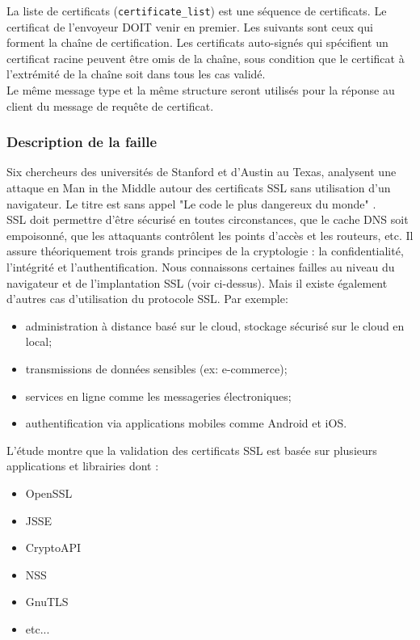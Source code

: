 La liste de certificats (\texttt{certificate\_list}) est une séquence de certificats. Le certificat de l'envoyeur DOIT venir en premier. Les suivants sont ceux qui forment la chaîne de certification. Les certificats auto-signés qui spécifient un certificat racine peuvent être omis de la chaîne, sous condition que le certificat à l'extrémité de la chaîne soit dans tous les cas validé.\\

Le même message type et la même structure seront utilisés pour la réponse au client du message de requête de certificat.


\subsubsection{Description de la faille}

Six chercheurs des universités de Stanford et d'Austin au Texas, analysent une attaque en Man in the Middle autour des certificats SSL sans utilisation d'un navigateur. Le titre est sans appel "Le code le plus dangereux du monde" \cite{validate2012martin}.\\


SSL doit permettre d'être sécurisé en toutes circonstances, que le cache DNS soit empoisonné, que les attaquants contrôlent les points d'accès et les routeurs, etc. Il assure théoriquement trois grands principes de la cryptologie : la confidentialité, l'intégrité et l'authentification. Nous connaissons certaines failles au niveau du navigateur et de l'implantation SSL (voir ci-dessus). Mais il existe également d'autres cas d'utilisation du protocole SSL. Par exemple:
\begin{itemize}
\item administration à distance basé sur le cloud, stockage sécurisé sur le cloud en local;
\item transmissions de données sensibles (ex: e-commerce);
\item services en ligne comme les messageries électroniques;
\item authentification via applications mobiles comme Android et iOS.\\
\end{itemize}

L'étude montre que la validation des certificats SSL est basée sur plusieurs applications et librairies dont :
\begin{itemize}
\item OpenSSL
\item JSSE
\item CryptoAPI
\item NSS
\item GnuTLS
\item etc...\\
\end{itemize}

